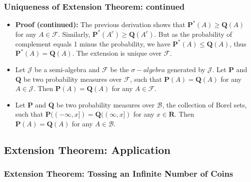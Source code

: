 \documentclass[handout]{beamer}
\newcommand{\BP}{\mathbf{P}}
\begin{document}
\frame
{
  \frametitle{Uniqueness of Extension Theorem: continued}

   \begin{itemize}
     
    
            \item<1->\textbf{Proof (continued):} The previous derivation shows that $ \BP^*(A)\geq \mathbf{Q} (A)$ for any $A\in\mathcal{F}$. Similarly, $ \BP^*(A^c)\geq \mathbf{Q} (A^c)$. But as the probability of complement equals 1 minus the probability, we have $ \BP^*(A)\leq \mathbf{Q} (A)$, thus  $ \BP^*(A)= \mathbf{Q} (A)$. The extension is unique over $\mathcal{F}.$
            
                   
    \item<2->[]    \begin{Corollary}[Proposition 2.5.8] Let $\mathcal{J}$ be a semi-algebra and $\mathcal{F}$ be the $\sigma-algebra$ generated by  $\mathcal{J}$. Let $\mathbf{P}$ and $\mathbf{Q}$ be two probability measures over $\mathcal{F}$, such that $\mathbf{P}(A)=\mathbf{Q} (A)$ for any $A\in\mathcal{J}$. Then $\mathbf{P}(A)=\mathbf{Q} (A)$ for any $A\in\mathcal{F}$. 
                
            \end{Corollary}    
                 
                     \item<3->[]    \begin{Corollary}[2.5.9] Let $\mathbf{P}$ and $\mathbf{Q}$ be two probability measures over $\mathcal{B}$,  the collection of Borel sets, such that $\mathbf{P}((-\infty, x])=\mathbf{Q} ((\infty,x])$ for any $x\in \mathbf{R}$. Then $\mathbf{P}(A)=\mathbf{Q} (A)$ for any $A\in\mathcal{B}$. 
                
            \end{Corollary}    
                   \end{itemize}

}


\subsection{Extension Theorem: Application}

\subsubsection{Extension Theorem: Tossing an Infinite Number of Coins}
\end{document}
